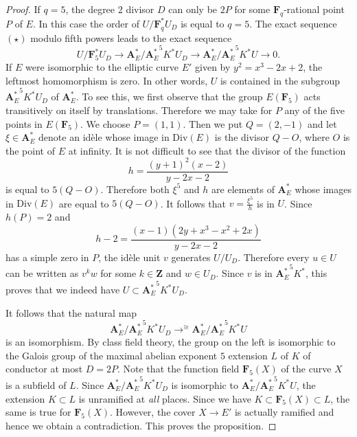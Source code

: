 \documentclass[10pt,a4paper]{amsart}
\renewcommand{\AA}{\mathbf{A}}
\newcommand{\FF}{\mathbf{F}}
\newcommand{\ZZ}{\mathbf{Z}}
\begin{document}
\begin{proof}
If $q=5$, the degree $2$ divisor $D$ can only be $2P$ for some
$\FF_q$-rational point $P$ of $E$. In this case the order of
$U/\FF_q^*U_D$ is equal to $q=5$. The exact sequence $(\star)$ modulo fifth powers
leads to the exact sequence
\[
U/\FF_5^*U_D
\longrightarrow
\AA_E^*/{\AA_E^*}^5K^*U_D
\longrightarrow
\AA_E^*/{\AA_E^*}^5K^*U
\longrightarrow 0.
\]
If $E$ were isomorphic to the elliptic curve $E'$ given by
$y^2=x^3-2x+2$, the leftmost homomorphism is zero. In other words, $U$ is
contained in the subgroup ${\AA_E^*}^5K^*U_D$ of $\AA_E^*$. To see this, we first observe that the group $E(\FF_5)$ acts transitively on
itself by translations. Therefore we may take for $P$ any of the five points in
$E(\FF_5)$. We choose $P=(1,1)$. Then we put $Q=(2,-1)$ and let
$\xi \in \AA_E^*$ denote an id\`ele whose image in $\mathrm{Div}(E)$ is the
divisor $Q-O$, where $O$ is the point of $E$ at infinity. It is not difficult to see that the divisor of the function
\[
h =
\frac{(y+1)^2(x-2)}{y-2x-2}
\]
is equal to $5(Q-O)$. Therefore both $\xi^5$ and $h$ are elements of
$\AA_E^*$ whose images in $\mathrm{Div}(E)$ are equal to $5(Q-O)$. It follows
that $v = \frac{\xi^5}{h}$ is in $U$. Since $h(P)=2$ and
\[
h-2 =
\frac{(x-1)(2y+x^3-x^2+2x)}{y-2x-2}
\]
has a simple zero in $P$, the id\`ele unit $v$ generates $U/U_D$. Therefore
every $u \in U$ can be written as $v^k w$ for some $k \in \ZZ$ and
$w \in U_D$. Since $v$ is in ${\AA_E^*}^5K^*$, this proves that we indeed have $U \subset {\AA_E^*}^5K^*U_D$.
 

It follows that the natural map
\[
\AA_E^*/{\AA_E^*}^5K^*U_D
\mathop{\longrightarrow}^{\cong}
\AA_E^*/{\AA_E^*}^5K^*U
\]
is an isomorphism. By class field theory, the group on the left is isomorphic
to the Galois group of the maximal abelian exponent $5$ extension $L$ of $K$ of
conductor at most $D=2P$. Note that the function field $\FF_5(X)$ of the curve
$X$ is a subfield of $L$. Since $\AA_E^*/{\AA_E^*}^5K^*U_D$ is isomorphic to  $\AA_E^*/{\AA_E^*}^5K^*U$,
 the extension $K \subset L$ is unramified at \textit{all} places. Since we have $K \subset \FF_5(X) \subset L$,
 the same is true for $\FF_5(X)$. However, the cover $X \rightarrow E'$ is
actually ramified and hence we obtain a contradiction.
This proves the proposition.
\end{proof}
\end{document}
